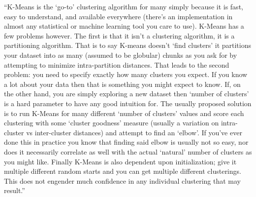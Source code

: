 \documentclass[11pt]{article}
\begin{document}
``K-Means is the `go-to' clustering algorithm for many simply because it
is fast, easy to understand, and available everywhere (there's an
implementation in almost any statistical or machine learning tool you
care to use). K-Means has a few problems however. The first is that it
isn't a clustering algorithm, it is a partitioning algorithm. That is to
say K-means doesn't `find clusters' it partitions your dataset into as
many (assumed to be globular) chunks as you ask for by attempting to
minimize intra-partition distances. That leads to the second problem:
you need to specify exactly how many clusters you expect. If you know a
lot about your data then that is something you might expect to know. If,
on the other hand, you are simply exploring a new dataset then `number
of clusters' is a hard parameter to have any good intuition for. The
usually proposed solution is to run K-Means for many different `number
of clusters' values and score each clustering with some `cluster
goodness' measure (usually a variation on intra-cluster vs inter-cluster
distances) and attempt to find an `elbow'. If you've ever done this in
practice you know that finding said elbow is usually not so easy, nor
does it necessarily correlate as well with the actual `natural' number
of clusters as you might like. Finally K-Means is also dependent upon
initialization; give it multiple different random starts and you can get
multiple different clusterings. This does not engender much confidence
in any individual clustering that may result.''
\end{document}
